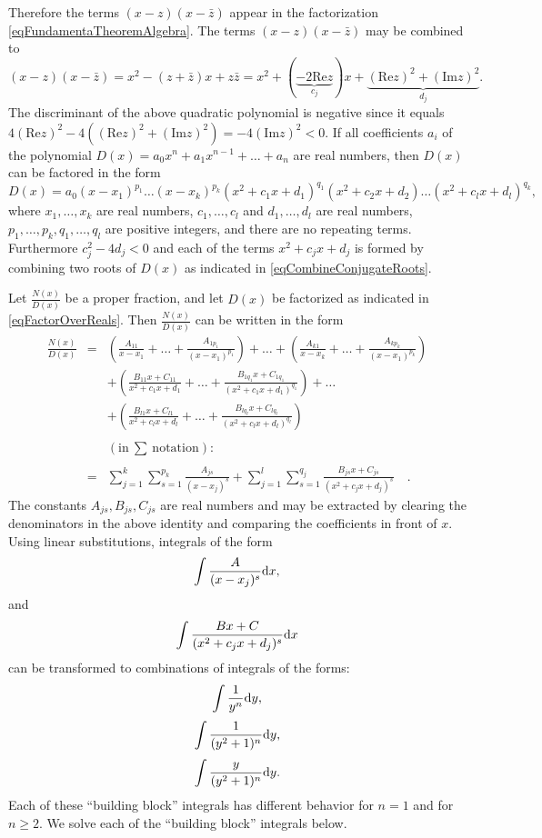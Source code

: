 \documentclass[12pt]{book}
\renewcommand{\Im}{\mathrm{Im}}
\renewcommand{\Re}{\mathrm{Re}}
\begin{document}
Therefore the terms  $(x-z)(x-\bar z)$ appear in the factorization \eqref{eqFundamentaTheoremAlgebra}. The terms $(x-z)(x-\bar z)$ may be combined to
\begin{equation}\label{eqCombineConjugateRoots}
(x-z)(x-\bar z)= x^2- (z+\bar z)x + z\bar z = x^{2}+ (\underbrace{-2\Re z}_{c_j})x+ \underbrace{(\Re z)^2+(\Im z)^2}_{d_j}.
\end{equation}
The discriminant of the above quadratic polynomial is negative since it equals $4(\Re z)^2- 4((\Re z)^2+(\Im z)^2)= -4(\Im z)^2<0$.
If all coefficients $a_i$ of the polynomial $D(x)= a_0x^n+a_{1}x^{n-1}+\dots + a_n$ are real numbers, then $D(x)$ can be factored in the form
\begin{equation}\label{eqFactorOverReals}
D(x)= a_0(x-x_1)^{p_1}\dots (x-x_k)^{p_k} (x^2+c_1x+d_1)^{q_1}(x^2+c_2x+d_2)\dots (x^2+c_lx +d_l)^{q_k},
\end{equation}
where $x_1, \dots, x_k$ are real numbers, $c_1, \dots, c_l$ and $d_1,\dots, d_l$ are real numbers, $p_1,\dots, p_k, q_1, \dots, q_l$ are positive integers, and there are no repeating terms. Furthermore $c_j^2-4d_j<0$ and each of the terms $x^2+c_j x+d_j$ is formed by combining two  roots of $D(x)$ as indicated in \eqref{eqCombineConjugateRoots}.

Let $\frac{N(x)}{D(x)}$ be a proper fraction, and let $D(x)$ be factorized as indicated in \eqref{eqFactorOverReals}. Then $\frac{N(x)}{D(x)}$ can be written in the form
\begin{equation}\label{eqSplitPF}
\begin{array}{rcl}
\displaystyle\frac{N(x)}{D(x)}&=&\displaystyle \left (\frac{A_{11}}{x-x_1}+\dots +\frac{A_{1p_1}}{(x-x_1)^{p_1}}\right) +\dots + \left (\frac{A_{k1}}{x-x_k}+\dots +\frac{A_{kp_k}}{(x-x_1)^{p_k}}\right) \\
&&\displaystyle+\left(\frac {B_{11}x+C_{11}}{x^2+c_1x+d_1}+\dots +\frac {B_{1q_1}x+C_{1q_1}}{(x^2+c_1x+d_1)^{q_1}} \right)+\dots
\\&&\displaystyle +
\left(\frac {B_{l1}x+C_{l1}}{x^2+c_lx+d_l}+\dots +\frac {B_{lq_l}x+C_{lq_l}}{(x^2+c_lx+d_l)^{q_l}} \right)\\ \\
&&(\mathrm{in~}\sum\mathrm{~notation}):\\ \\
&=&\displaystyle \sum_{j=1}^{k}\sum_{s=1}^{p_k} \frac{A_{js}}{(x-x_j)^s}+\sum_{j=1}^{l}\sum_{s=1}^{q_j} \frac{B_{js}x+C_{js}}{(x^2+c_jx+d_j)^s}\quad .
\end{array}
\end{equation}
The constants $A_{js}, B_{js}, C_{js}$ are real numbers and may be extracted by clearing the denominators in the above identity and comparing the coefficients in front of $x$.
Using linear substitutions, integrals of the form
\[
\displaystyle\int \frac{A}{(x-x_j)^s}{\normalfont \text{d}} x,
\]
and
\[
\int \frac{Bx+C}{(x^2+c_jx+d_j)^s}{\normalfont \text{d}} x
\]
can be transformed to combinations of integrals of the forms:
\[
\int \frac{1}{y^n}{\normalfont \text{d}} y,
\]
\[
\int \frac{1}{(y^2+1)^n}{\normalfont \text{d}} y,
\]
\[\int \frac{y}{(y^2+1)^n}{\normalfont \text{d}} y.
\]
Each of these ``building block'' integrals has different behavior for $n=1$ and for $n\geq 2$. We solve each of the ``building block'' integrals below.
\end{document}
